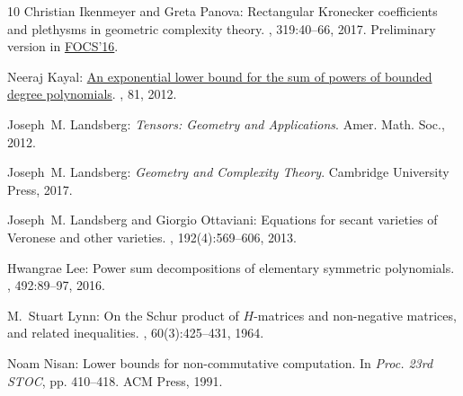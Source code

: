 \documentclass[11pt]{article}
\numberwithin{equation}{section}
\theoremstyle{definition}
\theoremstyle{plain}
\begin{document}
\begin{thebibliography}{10}
{\sc Christian Ikenmeyer and Greta Panova}: {Rectangular Kronecker coefficients
  and plethysms in geometric complexity theory}.
, 319:40--66, 2017.
\newblock Preliminary version in
  \href{https://ieeexplore.ieee.org/document/7782954}{FOCS'16}.

{\sc Neeraj Kayal}: \href{https://eccc.weizmann.ac.il/report/2012/081/}{An
  exponential lower bound for the sum of powers of bounded degree polynomials}.
, 81, 2012.

{\sc Joseph~M. Landsberg}: {\em {Tensors: {G}eometry and {A}pplications}}.
\newblock Amer. Math. Soc., 2012.

{\sc Joseph~M. Landsberg}: {\em {Geometry and Complexity Theory}}.
\newblock Cambridge University Press, 2017.
\newblock [\epfmtdoi{10.1017/9781108183192}]

{\sc Joseph~M. Landsberg and Giorgio Ottaviani}: {Equations for secant
  varieties of {V}eronese and other varieties}.
, 192(4):569--606, 2013.

{\sc Hwangrae Lee}: Power sum decompositions of elementary symmetric
  polynomials.
, 492:89--97, 2016.

{\sc M.~Stuart Lynn}: On the {S}chur product of {$H$}-matrices and non-negative
  matrices, and related inequalities.
, 60(3):425--431, 1964.
\newblock [\epfmtdoi{10.1017/S0305004100037932}]

{\sc Noam Nisan}: {Lower bounds for non-commutative computation}.
\newblock In {\em Proc. 23rd STOC}, pp. 410--418. ACM Press, 1991.
\newblock [\epfmtdoi{10.1145/103418.103462}]


\end{thebibliography}
\end{document}
